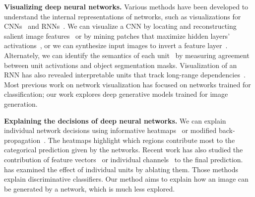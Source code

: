 \documentclass{article} %
\begin{document}
\textbf{Visualizing deep neural networks.} Various methods have been developed to understand the internal representations of networks, such as visualizations for CNNs~\citep{zeiler2014visualizing} and RNNs~\citep{karpathy2016visualizing, lstmvis}. We can visualize a CNN by locating and reconstructing salient image features~\citep{simonyan2014deep,mahendran2015understanding} or by mining patches that maximize hidden layers' activations~\citep{zeiler2014visualizing}, or we can synthesize input images to invert a feature layer~\citep{dosovitskiy2016generating}. Alternately, we can identify the semantics of each unit~\citep{zhou2014object,bau2017network,zhou2018interpreting} by measuring agreement between unit activations and object segmentation masks. Visualization of an RNN has also revealed interpretable units that track long-range dependencies~\citep{karpathy2016visualizing}. Most previous work on network visualization has focused on networks trained for classification; our work explores deep generative models trained for image generation.

\textbf{Explaining the decisions of deep neural networks.} We can explain individual network decisions using  informative heatmaps~\citep{zhou2018interpretable,zhou2016learning,selvaraju2017grad} or modified back-propagation~\citep{simonyan2014deep,bach2015pixel,sundararajan17a}. The heatmaps highlight which regions contribute most to the categorical prediction given by the networks. Recent work has also studied the contribution of feature vectors~\citep{kim2017tcav,zhou2018interpretable} or individual channels~\citep{olah2018building} to the final prediction. \citet{morcos2018importance} has examined the effect of individual units by ablating them. Those methods explain discriminative classifiers. Our method aims to explain how an image can be generated by a network, which is much less explored.
\end{document}
